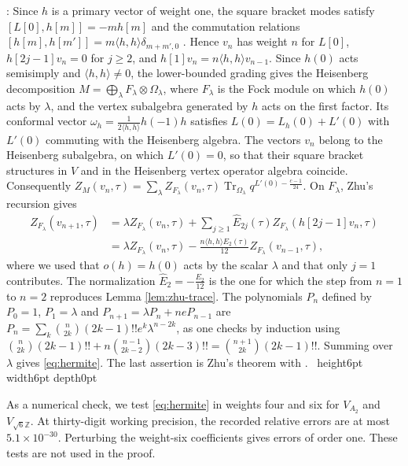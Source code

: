 \documentclass[leqno]{article}
\newcommand{\Z}{\ensuremath{\mathbb{Z}}}
\renewcommand{\geq}{\ensuremath{\geqslant}}
\newcommand{\qed}{\hfill \vrule height6pt  width6pt depth0pt}
\newcommand{\ot}{\otimes}
\newenvironment{proof}[1][]{\noindent {\it Proof #1} : }{\hbox{~}\qed
\smallskip
}
\numberwithin{equation}{section}
\begin{document}
\begin{proof}
Since $h$ is a primary vector of weight one, the square bracket modes satisfy $[L[0],h[m]] = -mh[m]$ and the commutation relations $[h[m],h[m']] = m\langle h,h\rangle\delta_{m+m',0}$ \cite[Section 4]{Zhu96}. Hence $v_n$ has weight $n$ for $L[0]$, $h[2j-1]v_n = 0$ for $j \geq 2$, and $h[1]v_n = n\langle h,h\rangle v_{n-1}$. Since $h(0)$ acts semisimply and $\langle h,h\rangle \neq 0$, the lower-bounded grading gives the Heisenberg decomposition $M = \bigoplus_\lambda F_\lambda \ot \Omega_\lambda$, where $F_\lambda$ is the Fock module on which $h(0)$ acts by $\lambda$, and the vertex subalgebra generated by $h$ acts on the first factor. Its conformal vector $\omega_h = \frac{1}{2\langle h,h\rangle}h(-1)h$ satisfies $L(0) = L_h(0)+L'(0)$ with $L'(0)$ commuting with the Heisenberg algebra. The vectors $v_n$ belong to the Heisenberg subalgebra, on which $L'(0) = 0$, so that their square bracket structures in $V$ and in the Heisenberg vertex operator algebra coincide. Consequently $Z_M(v_n,\tau) = \sum_\lambda Z_{F_\lambda}(v_n,\tau)\operatorname{Tr}_{\Omega_\lambda}q^{L'(0)-\frac{c-1}{24}}$. On $F_\lambda$, Zhu's recursion \cite[Proposition 4.3.5]{Zhu96} gives
\begin{align*}
Z_{F_\lambda}(v_{n+1},\tau)
&= \lambda Z_{F_\lambda}(v_n,\tau)+\sum_{j \geq 1}\widehat E_{2j}(\tau)Z_{F_\lambda}(h[2j-1]v_n,\tau) \\
&= \lambda Z_{F_\lambda}(v_n,\tau)-\frac{n\langle h,h\rangle E_2(\tau)}{12}Z_{F_\lambda}(v_{n-1},\tau),
\end{align*}
where we used that $o(h) = h(0)$ acts by the scalar $\lambda$ and that only $j = 1$ contributes. The normalization $\widehat E_2 = -\frac{E_2}{12}$ is the one for which the step from $n = 1$ to $n = 2$ reproduces Lemma \ref{lem:zhu-trace}. The polynomials $P_n$ defined by $P_0 = 1$, $P_1 = \lambda$ and $P_{n+1} = \lambda P_n+ne P_{n-1}$ are $P_n = \sum_k\binom{n}{2k}(2k-1)!!e^k\lambda^{n-2k}$, as one checks by induction using $\binom{n}{2k}(2k-1)!!+n\binom{n-1}{2k-2}(2k-3)!! = \binom{n+1}{2k}(2k-1)!!$. Summing over $\lambda$ gives \eqref{eq:hermite}. The last assertion is Zhu's theorem \cite{Zhu96} with \cite{Hua08}.
\end{proof}

As a numerical check, we test \eqref{eq:hermite} in weights four and six for $V_{A_2}$ and $V_{\sqrt6\Z}$. At thirty-digit working precision, the recorded relative errors are at most $5.1\times10^{-30}$. Perturbing the weight-six coefficients gives errors of order one. These tests are not used in the proof.
\end{document}
